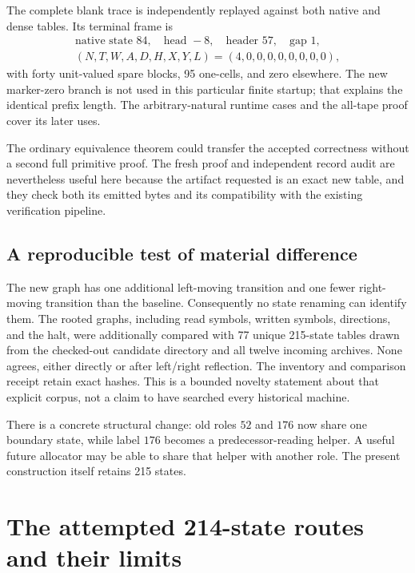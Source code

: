 \documentclass[11pt]{article}
\theoremstyle{definition}\newtheorem{definition}[theorem]{Definition}
\theoremstyle{remark}\newtheorem{remark}[theorem]{Remark}
\begin{document}
The complete blank trace is independently replayed against both native
and dense tables. Its terminal frame is
\[
\begin{gathered}
 \text{native state }84,\quad\text{head }-8,\quad
 \text{header }57,\quad\text{gap }1,\\
 (N,T,W,A,D,H,X,Y,L)=(4,0,0,0,0,0,0,0,0),
\end{gathered}
\]
with forty unit-valued spare blocks, 95 one-cells, and zero elsewhere.
The new marker-zero branch is not used in this particular finite startup;
that explains the identical prefix length. The arbitrary-natural runtime
cases and the all-tape proof cover its later uses.

The ordinary equivalence theorem could transfer the accepted correctness
without a second full primitive proof. The fresh proof and independent
record audit are nevertheless useful here because the artifact requested
is an exact new table, and they check both its emitted bytes and its
compatibility with the existing verification pipeline.

\subsection{A reproducible test of material difference}

The new graph has one additional left-moving transition and one fewer
right-moving transition than the baseline. Consequently no state renaming
can identify them. The rooted graphs, including read symbols, written
symbols, directions, and the halt, were additionally compared with 77
unique 215-state tables drawn from the checked-out candidate directory
and all twelve incoming archives. None agrees, either directly or after
left/right reflection. The inventory and comparison receipt retain exact
hashes. This is a bounded novelty statement about that explicit corpus,
not a claim to have searched every historical machine.

There is a concrete structural change: old roles $52$ and $176$ now share
one boundary state, while label $176$ becomes a predecessor-reading
helper. A useful future allocator may be able to share that helper with
another role. The present construction itself retains 215 states.




\section{The attempted 214-state routes and their limits}
\label{sec:search}
\end{document}
